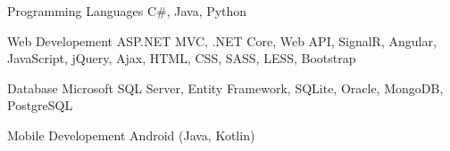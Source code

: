 


\begin{cvskills}


\cvskill
{Programming Languages} %
{C\#, Java, Python} %


\cvskill
{Web Developement} %
{ASP.NET MVC, .NET Core, Web API, SignalR, Angular, JavaScript, jQuery, Ajax, HTML, CSS, SASS, LESS, Bootstrap} %


\cvskill
{Database} %
{Microsoft SQL Server, Entity Framework, SQLite, Oracle, MongoDB, PostgreSQL} %


\cvskill
{Mobile Developement} %
{Android (Java, Kotlin)} %


\end{cvskills}